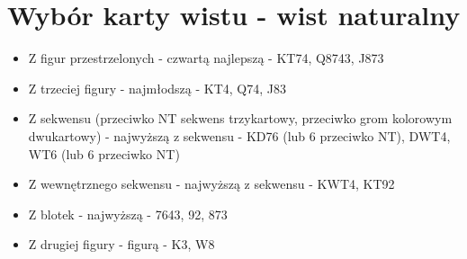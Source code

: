 \documentclass{article}
\begin{document}
    \section{Wybór karty wistu - wist naturalny}
    	\begin{itemize}
    	\item Z figur przestrzelonych - czwartą najlepszą - KT7{\color{red}4}, Q87{\color{red}4}3, J87{\color{red}3}
    	\item Z trzeciej figury - najmłodszą - KT{\color{red}4}, Q7{\color{red}4}, J8{\color{red}3}
    	\item Z sekwensu (przeciwko NT sekwens trzykartowy, przeciwko grom kolorowym dwukartowy) - najwyższą z sekwensu - {\color{red}K}D76 (lub 6 przeciwko NT), {\color{red}D}WT4, {\color{red}W}T6 (lub 6 przeciwko NT)
    	\item Z wewnętrznego sekwensu - najwyższą z sekwensu - K{\color{red}W}T4, K{\color{red}T}92
    	\item Z blotek - najwyższą - {\color{red}7}643, {\color{red}9}2, {\color{red}8}73
    	\item Z drugiej figury - figurą - {\color{red}K}3, {\color{red}W}8
    	\end{itemize}
\end{document}
